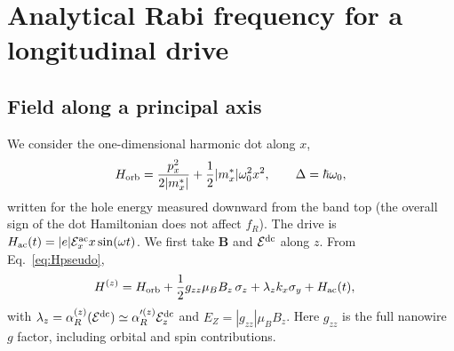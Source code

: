 \documentclass[
  aps,
  reprint,
  amsmath,
  amssymb,
  groupedaddress,
  floatfix,
  longbibliography,
]{revtex4-2}
\newcommand{\Eac}{\mathcal{E}^{\rm ac}_x}
\newcommand{\Edc}{\mathcal{E}^{\rm dc}}
\begin{document}
\section{Analytical Rabi frequency for a longitudinal drive}
\label{app:analytical_EDSR}

\subsection{Field along a principal axis}
We consider the one-dimensional harmonic dot along $x$,
\begin{align}
H_{\rm orb}
=
\frac{p_x^2}{2|m_x^\ast|}
+
\frac{1}{2}|m_x^\ast|\omega_0^2x^2,
\qquad
\Delta=\hbar\omega_0,
\end{align}
written for the hole energy measured downward from the band top (the overall sign of the dot Hamiltonian does not affect $f_R$). The drive is $H_{\rm ac}(t)=|e|\Eac x\sin(\omega t)$. We first take $\mathbf{B}$ and $\Edc$ along $z$. From Eq.~\eqref{eq:Hpseudo},
\begin{align}
H^{(z)}
&=
H_{\rm orb}
+
\frac{1}{2}g_{zz}\mu_B B_z\,\sigma_z
+
\lambda_z k_x\sigma_y
+
H_{\rm ac}(t),
\end{align}
with $\lambda_z=\alpha_R^{(z)}(\Edc)\simeq\alpha_R'^{(z)}\mathcal{E}^{\rm dc}_z$ and $E_Z=|g_{zz}|\mu_B B_z$. Here $g_{zz}$ is the full nanowire $g$ factor, including orbital and spin contributions.
\end{document}
